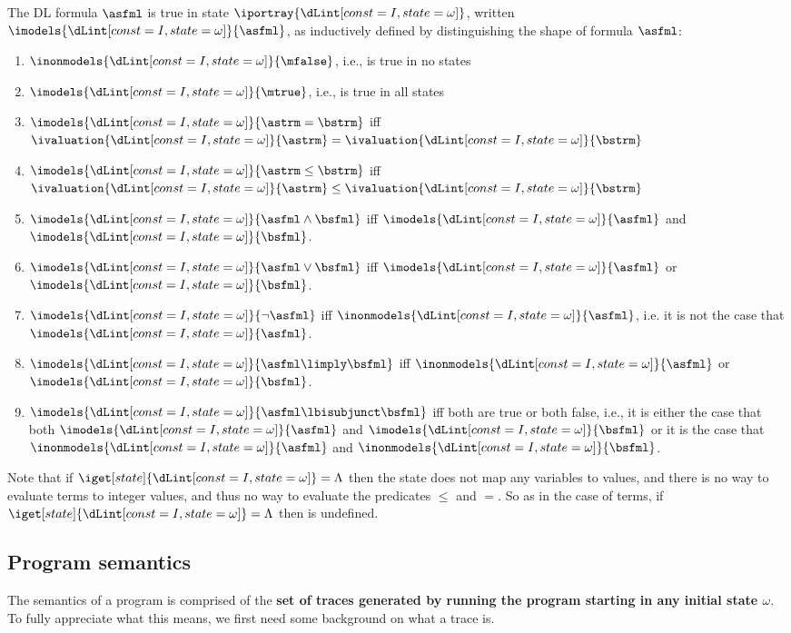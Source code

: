 \documentclass[11pt,twoside]{scrartcl}
\newcommand{\errstate}{\ensuremath{\Lambda}\xspace}
\begin{document}
\begin{definition} \label{def:arithmetic-semantics}
The DL formula $\asfml$ is true in state $\iportray{\I}$, written \(\imodels{\I}{\asfml}\), as inductively defined by distinguishing the shape of formula $\asfml$:
\begin{enumerate}
\item \(\inonmodels{\I}{\mfalse}\), i.e., \mfalse is true in no states
\item \(\imodels{\I}{\mtrue}\), i.e., \mtrue is true in all states
\item \(\imodels{\I}{\astrm=\bstrm}\) iff \(\ivaluation{\I}{\astrm}=\ivaluation{\I}{\bstrm}\)
\item \(\imodels{\I}{\astrm\leq\bstrm}\) iff \(\ivaluation{\I}{\astrm}\leq\ivaluation{\I}{\bstrm}\)
\item \(\imodels{\I}{\asfml\land\bsfml}\) iff \(\imodels{\I}{\asfml}\) and \(\imodels{\I}{\bsfml}\).
\item \(\imodels{\I}{\asfml\lor\bsfml}\) iff \(\imodels{\I}{\asfml}\) or \(\imodels{\I}{\bsfml}\).
\item \(\imodels{\I}{\lnot\asfml}\) iff \(\inonmodels{\I}{\asfml}\), i.e. it is not the case that \(\imodels{\I}{\asfml}\).
\item \(\imodels{\I}{\asfml\limply\bsfml}\) iff \(\inonmodels{\I}{\asfml}\) or \(\imodels{\I}{\bsfml}\).
\item \(\imodels{\I}{\asfml\lbisubjunct\bsfml}\) iff both are true or both false, i.e., it is either the case that both \(\imodels{\I}{\asfml}\) and \(\imodels{\I}{\bsfml}\) or it is the case that \(\inonmodels{\I}{\asfml}\) and \(\inonmodels{\I}{\bsfml}\).
\end{enumerate}
Note that if $\iget[state]{\I} = \errstate$ then the state does not map any variables to values, and there is no way to evaluate terms to integer values, and thus no way to evaluate the predicates $\le$ and $=$. So as in the case of terms, if $\iget[state]{\I} = \errstate$ then \m{\imodels{\I}{\ausfml}} is undefined.
\end{definition}

\subsection{Program semantics}

The semantics of a program is comprised of the \textbf{set of traces generated by running the program starting in any initial state $\omega$}.
To fully appreciate what this means, we first need some background on what a trace is.
\end{document}
